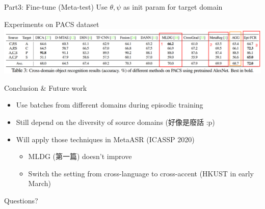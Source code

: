 \documentclass{beamer}
\begin{document}
\begin{frame}{Part3: Fine-tune (Meta-test)}
  Use $\theta, \psi$ as init param for target domain
\end{frame}

\begin{frame}[t]{Experiments on PACS dataset}
  \includegraphics[width=\textwidth]{fig/pacs-exp.png}
\end{frame}

\begin{frame}{Conclusion \& Future work}
  \begin{itemize}
    \item Use batches from different domains during episodic training
    \item Still depend on the diversity of source domains (好像是廢話 :p)
    \item Will apply those techniques in MetaASR (ICASSP 2020)
        \begin{itemize}
          \item MLDG (第一篇) doesn't improve 
          \item Switch the setting from cross-language to cross-accent (HKUST in early March)
        \end{itemize}
  \end{itemize}
\end{frame}

\begin{frame}
	\begin{center}
    \LARGE{Questions?}
	\end{center}
\end{frame}
\end{document}
